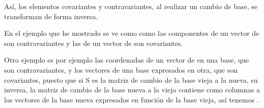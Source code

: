 Así, los elementos covariantes y contravariantes, al realizar un cambio de base, se transforman de forma inversa.

En el ejemplo que he mostrado se ve como como las componentes de un vector de  son contravariantes y las de un vector de  son covariantes.

Otro ejemplo es por ejemplo las coordenadas de un vector de  en una base, que son contravariantes, y los vectores de una base expresados en otra, que son covariantes, puesto que si S es la matriz de cambio de la base vieja a la nueva, su inversa, la matriz de cambio de la base nueva a la vieja contiene como columnas a los vectores de la base nueva expresados en función de la base vieja, así tenemos .